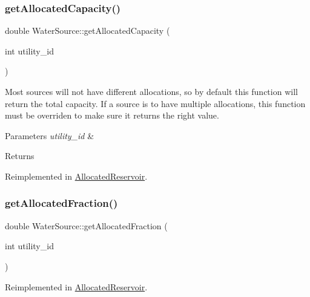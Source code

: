 \subsubsection{\texorpdfstring{get\+Allocated\+Capacity()}{getAllocatedCapacity()}}
{\footnotesize\ttfamily double Water\+Source\+::get\+Allocated\+Capacity (\begin{DoxyParamCaption}\item[{int}]{utility\+\_\+id }\end{DoxyParamCaption})\hspace{0.3cm}{\ttfamily [virtual]}}

Most sources will not have different allocations, so by default this function will return the total capacity. If a source is to have multiple allocations, this function must be overriden to make sure it returns the right value. 
\begin{DoxyParams}{Parameters}
{\em utility\+\_\+id} & \\
\hline
\end{DoxyParams}
\begin{DoxyReturn}{Returns}

\end{DoxyReturn}


Reimplemented in \mbox{\hyperlink{classAllocatedReservoir_a8b9b38494fa23f0bea78134c82644bf1}{Allocated\+Reservoir}}.

\mbox{\label{classWaterSource_a1843ada21b8e7500d80a5a7db10621b3}} 
\subsubsection{\texorpdfstring{get\+Allocated\+Fraction()}{getAllocatedFraction()}}
{\footnotesize\ttfamily double Water\+Source\+::get\+Allocated\+Fraction (\begin{DoxyParamCaption}\item[{int}]{utility\+\_\+id }\end{DoxyParamCaption})\hspace{0.3cm}{\ttfamily [virtual]}}



Reimplemented in \mbox{\hyperlink{classAllocatedReservoir_a731381982c9245b0bf24db4082dc74c1}{Allocated\+Reservoir}}.

\mbox{\label{classWaterSource_a63b1a410b47710db049e2b2e9c3c39a0}} 
